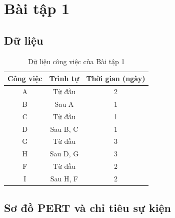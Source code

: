 \section{Bài tập 1}

\subsection{Dữ liệu}

\begin{table}[H]\centering
\caption{Dữ liệu công việc của Bài tập 1}
\begin{tabular}{c c c}
\toprule
\textbf{Công việc} & \textbf{Trình tự} & \textbf{Thời gian (ngày)}\\
\midrule
A & Từ đầu & 2\\
B & Sau A & 1\\
C & Từ đầu & 1\\
D & Sau B, C & 1\\
G & Từ đầu & 3\\
H & Sau D, G & 3\\
F & Từ đầu & 2\\
I & Sau H, F & 2\\
\bottomrule
\end{tabular}
\end{table}

\subsection{Sơ đồ PERT và chỉ tiêu sự kiện}

